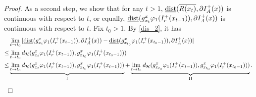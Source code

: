 \documentclass[a4paper,11pt]{article}
\theoremstyle{plain}
\theoremstyle{definition}
\numberwithin{equation}{section}
\begin{document}
\begin{proof}
    
    
    
    


    As a second step, we show that for any $t>1$, ${\rm\underline{dist}}(\overline{R(x_t)},\partial  I^{+}_{A}(x))$ is continuous with respect to $t$, or equally, ${\rm\underline{dist}}(g_{x_{t}}^{x}\varphi_1 (I^{+}_{r}(x_{t-1})), \partial  I^{+}_{A}(x))$ is continuous with respect to $t$. Fix $t_0>1$. By \eqref{dis_2}, it has 
    \begin{align}\label{t0t}
    &\lim_{t\rightarrow t_{0}}|{\rm\underline{dist}}(g_{x_{t}}^{x}\varphi_1 (I^{+}_{r}(x_{t-1})), \partial  I^{+}_{A}(x))-{\rm\underline{dist}}(g_{x_{t_{0}}}^{x}\varphi_1 (I^{+}_{r}(x_{t_{0}-1})), \partial  I^{+}_{A}(x))|\notag\\
    \leq &\lim_{t\rightarrow t_{0}}d_{\mathcal{H}}(g_{x_{t}}^{x}\varphi_1 (I^{+}_{r}(x_{t-1})),g_{x_{t_{0}}}^{x}\varphi_1 (I^{+}_{r}(x_{t_{0}-1})))\notag\\
    \leq &\underbrace{\lim_{t\rightarrow t_{0}}d_{\mathcal{H}}(g_{x_{t}}^{x}\varphi_1 (I^{+}_{r}(x_{t-1})),g_{x_{t_{0}}}^{x}\varphi_1 (I^{+}_{r}(x_{t-1})))}_{\text{I}}+\underbrace{\lim_{t\rightarrow t_{0}}d_{\mathcal{H}}(g_{x_{t_{0}}}^{x}\varphi_1 (I^{+}_{r}(x_{t-1})),g_{x_{t_{0}}}^{x}\varphi_1 (I^{+}_{r}(x_{t_{0}-1})))}_{\text{II}}.
    \end{align}
    

\end{proof}
\end{document}
